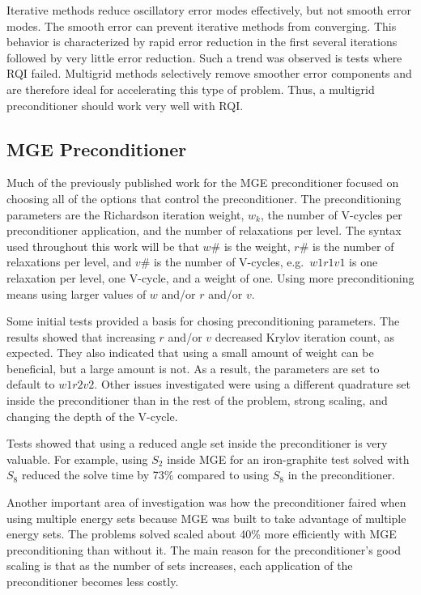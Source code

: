 \documentclass[preprint,12pt]{elsarticle}
\begin{document}
Iterative methods reduce oscillatory error modes effectively, but not smooth error modes. The smooth error can prevent iterative methods from converging. This behavior is characterized by rapid error reduction in the first several iterations followed by very little error reduction. Such a trend was observed is tests where RQI failed. Multigrid methods selectively remove smoother error components and are therefore ideal for accelerating this type of problem. Thus, a multigrid preconditioner should work very well with RQI. 

\subsection{MGE Preconditioner}
Much of the previously published work for the MGE preconditioner focused on choosing all of the options that control the preconditioner. The preconditioning parameters are the Richardson iteration weight, $w_{k}$, the number of V-cycles per preconditioner application, and the number of relaxations per level. The syntax used throughout this work will be that $w\#$ is the weight, $r\#$ is the number of relaxations per level, and $v\#$ is the number of V-cycles, e.g.\ $w1r1v1$ is one relaxation per level, one V-cycle, and a weight of one. Using more preconditioning means using larger values of $w$ and/or $r$ and/or $v$. 

Some initial tests provided a basis for chosing preconditioning parameters. The results showed that increasing $r$ and/or $v$ decreased Krylov iteration count, as expected. They also indicated that using a small amount of weight can be beneficial, but a large amount is not. As a result, the parameters are set to default to $w1r2v2$. Other issues investigated were using a different quadrature set inside the preconditioner than in the rest of the problem, strong scaling, and changing the depth of the V-cycle. 

Tests showed that using a reduced angle set inside the preconditioner is very valuable. For example, using $S_2$ inside MGE for an iron-graphite test solved with $S_8$ reduced the solve time by 73\% compared to using $S_8$ in the preconditioner.

Another important area of investigation was how the preconditioner faired when using multiple energy sets because MGE was built to take advantage of multiple energy sets. The problems solved scaled about 40\% more efficiently with MGE preconditioning than without it. The main reason for the preconditioner’s good scaling is that as the number of sets increases, each application of the preconditioner becomes less costly. 
\end{document}
